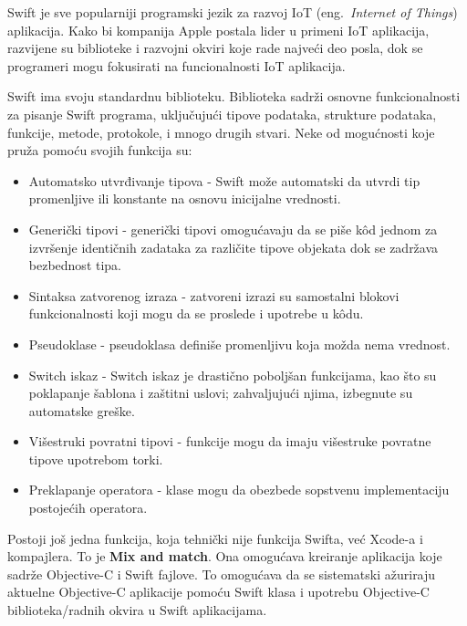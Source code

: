 \documentclass[a4paper]{article}
\begin{document}
Swift je sve popularniji programski jezik za razvoj IoT (eng.~{\em Internet of Things}) aplikacija. Kako bi kompanija Apple postala lider u primeni IoT aplikacija, razvijene su biblioteke i razvojni okviri koje rade najveći deo posla, dok se programeri mogu fokusirati na funcionalnosti IoT aplikacija.

Swift ima svoju standardnu biblioteku. Biblioteka sadrži osnovne funkcionalnosti za pisanje Swift programa, uključujući tipove podataka, strukture podataka, funkcije, metode, protokole, i mnogo drugih stvari.\cite{naucni_rad}
Neke od mogućnosti koje pruža pomoću svojih funkcija su: \cite{mastering_swift3}
\begin{itemize}
\item Automatsko utvrđivanje tipova - Swift može automatski da utvrdi tip promenljive ili konstante na osnovu inicijalne
vrednosti. 
\item Generički tipovi - generički tipovi omogućavaju da se piše k\^{o}d jednom za izvršenje identičnih
zadataka za različite tipove objekata dok se zadržava bezbednost tipa. 
\item Sintaksa zatvorenog izraza - zatvoreni izrazi su samostalni blokovi funkcionalnosti koji mogu da se proslede i upotrebe u k\^{o}du.
\item Pseudoklase - pseudoklasa definiše promenljivu koja možda nema vrednost.
\item Switch iskaz - Switch iskaz je drastično poboljšan funkcijama, kao što su poklapanje šablona i
zaštitni uslovi; zahvaljujući njima, izbegnute su automatske greške.
\item Višestruki povratni tipovi - funkcije mogu da imaju višestruke povratne tipove upotrebom torki. 
\item Preklapanje operatora - klase mogu da obezbede sopstvenu implementaciju postojećih operatora. 
\end{itemize}

Postoji još jedna funkcija, koja tehnički nije
funkcija Swifta, već Xcode-a i kompajlera. To je \textbf{Mix and match}. Ona omogućava kreiranje aplikacija koje sadrže Objective-C i Swift fajlove. To omogućava da se sistematski ažuriraju aktuelne Objective-C aplikacije pomoću Swift klasa i upotrebu Objective-C biblioteka/radnih okvira u Swift aplikacijama.
\end{document}
